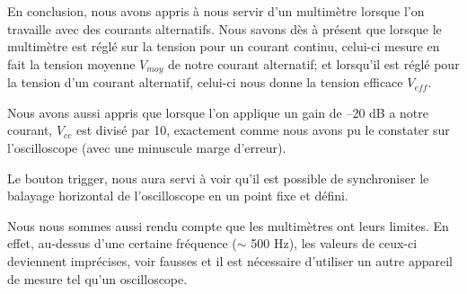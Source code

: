 \documentclass[a4paper]{article}
\begin{document}
En conclusion, nous avons appris à nous servir d’un multimètre lorsque l’on travaille avec des courants alternatifs. Nous savons dès à présent que lorsque le multimètre est réglé sur la tension pour un courant continu, celui-ci mesure en fait la tension moyenne $ V_{moy} $ de notre courant alternatif; et lorsqu’il est réglé pour la tension d’un courant alternatif, celui-ci nous donne la tension efficace $ V_{eff} $.

Nous avons aussi appris que lorsque l’on applique un gain de –20 dB a notre courant, $ V_{cc} $ est divisé par 10, exactement comme nous avons pu le constater sur l’oscilloscope (avec une minuscule marge d’erreur). 

Le bouton trigger, nous aura servi à voir qu’il est possible de synchroniser le balayage horizontal de l’oscilloscope en un point fixe et défini. 

Nous nous sommes aussi rendu compte que les multimètres ont leurs limites. En effet, au-dessus d’une certaine fréquence ($ \sim $ 500 Hz), les valeurs de ceux-ci deviennent imprécises, voir fausses et il est nécessaire d’utiliser un autre appareil de mesure tel qu’un oscilloscope.















\newpage \tableofcontents \listoffigures
\end{document}
